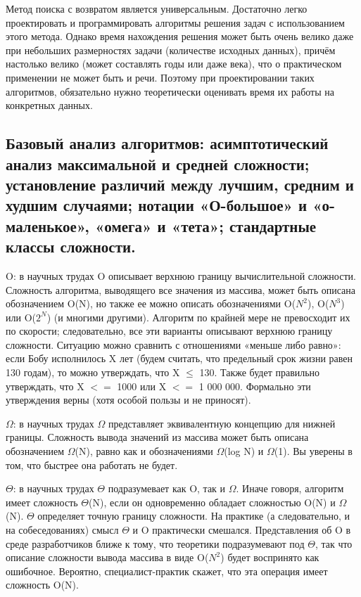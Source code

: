\documentclass[12pt, a4paper]{article}
\begin{document}
Метод поиска с возвратом является универсальным. Достаточно легко проектировать и программировать алгоритмы решения задач с использованием этого метода. Однако время нахождения решения может быть очень велико даже при небольших размерностях задачи (количестве исходных данных), причём настолько велико (может составлять годы или даже века), что о практическом применении не может быть и речи. Поэтому при проектировании таких алгоритмов, обязательно нужно теоретически оценивать время их работы на конкретных данных.

\subsection{Базовый анализ алгоритмов: асимптотический анализ максимальной и средней сложности; установление различий между лучшим, средним и худшим случаями; нотации «О-большое» и «о-маленькое», «омега» и «тета»; стандартные классы сложности.}

O: в научных трудах O описывает верхнюю границу вычислительной сложности.
Сложность алгоритма, выводящего все значения из массива, может быть описана
обозначением O(N), но также ее можно описать обозначениями O($N^2$), O($N^3$) или
O($2^N$) (и многими другими). Алгоритм по крайней мере не превосходит их по
скорости; следовательно, все эти варианты описывают верхнюю границу сложности. Ситуацию можно сравнить с отношениями «меньше либо равно»: если Бобу
исполнилось X лет (будем считать, что предельный срок жизни равен 130 годам),
то можно утверждать, что X $≤$ 130. Также будет правильно утверждать, что X $<=$ 1000
или X $<=$ 1 000 000. Формально эти утверждения верны (хотя особой пользы и не приносят).

$\Omega{}$: в научных трудах $\Omega{}$ представляет эквивалентную концепцию для нижней границы. Сложность вывода значений из массива может быть описана обозначением $\Omega{}$(N), равно как и обозначениями $\Omega{}$(log N) и $\Omega{}$(1). Вы уверены в том, что быстрее она работать не будет.

$\Theta{}$: в научных трудах $\Theta{}$ подразумевает как O, так и $\Omega{}$. Иначе говоря, алгоритм имеет
сложность $\Theta{}$(N), если он одновременно обладает сложностью O(N) и $\Omega{}$(N). $\Theta{}$ определяет точную границу сложности.
На практике (а следовательно, и на собеседованиях) смысл $\Theta{}$ и O практически
смешался. Представления об O в среде разработчиков ближе к тому, что теоретики
подразумевают под $\Theta{}$, так что описание сложности вывода массива в виде O($N^2$)
будет воспринято как ошибочное. Вероятно, специалист-практик скажет, что эта
операция имеет сложность O(N).
\end{document}
